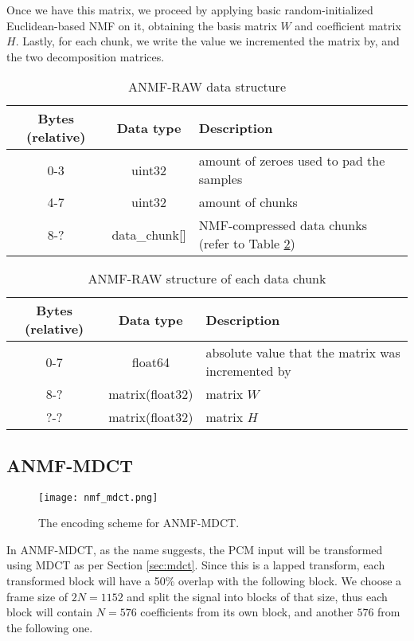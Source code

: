 Once we have this matrix, we proceed by applying basic random-initialized Euclidean-based NMF on it, obtaining the basis matrix $W$ and coefficient matrix $H$. Lastly, for each chunk, we write the value we incremented the matrix by, and the two decomposition matrices.

\begin{table}[htbp]\caption{ANMF-RAW data structure}
	\label{tab:anmf_raw_file}
	\centering
	\begin{tabular}{|c|c|l|}
		\hline
		Bytes (relative) & Data type & Description \\ \hline
		0-3 & uint32 & amount of zeroes used to pad the samples \\
		4-7 & uint32 & amount of chunks \\
		8-? & data\_chunk[] & NMF-compressed data chunks (refer to Table \ref{tab:anmf_raw_data}) \\
		\hline
	\end{tabular}
\end{table}

\begin{table}[htbp]\caption{ANMF-RAW structure of each data chunk}
	\label{tab:anmf_raw_data}
	\centering
	\begin{tabular}{|c|c|l|}
		\hline
		Bytes (relative) & Data type & Description \\ \hline
		0-7 & float64 & absolute value that the matrix was incremented by \\
		8-? & matrix(float32) & matrix $W$ \\
		?-? & matrix(float32) & matrix $H$ \\
		\hline
	\end{tabular}
\end{table}

\subsection{ANMF-MDCT}
\begin{figure}[ht]
	\caption[ANMF-MDCT Encoder]{The encoding scheme for ANMF-MDCT.}
	\label{fig:encoding_nmf_mdct}
	\centering
	\texttt{[image: nmf\_mdct.png]}
\end{figure}

In ANMF-MDCT, as the name suggests, the PCM input will be transformed using MDCT as per Section \ref{sec:mdct}. Since this is a lapped transform, each transformed block will have a 50\% overlap with the following block. We choose a frame size of $2N = 1152$ and split the signal into blocks of that size, thus each block will contain $N = 576$ coefficients from its own block, and another $576$ from the following one.

